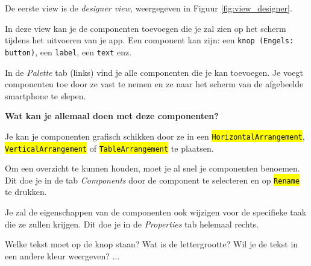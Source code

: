 De eerste view is de \emph{designer view}, weergegeven in Figuur \ref{fig:view_designer}.


In deze view kan je de componenten toevoegen die je zal zien op het scherm tijdens het uitvoeren van je app.
Een component kan zijn: een \texttt{knop (Engels: button)}, een \texttt{label}, een \texttt{text} enz.

\begin{minipage}{.3\linewidth}
\end{minipage}
\hspace{2cm}
\begin{minipage}{.5\linewidth}
	In de \emph{Palette} tab (links) vind je alle componenten die je kan toevoegen. Je voegt componenten toe door ze vast te nemen en ze naar het scherm van de afgebeelde smartphone te slepen. 
\end{minipage}


\textbf{Wat kan je allemaal doen met deze componenten? }

\begin{minipage}{.3\linewidth}
\end{minipage}
\hspace{2cm}
\begin{minipage}{.5\linewidth}
	Je kan je componenten grafisch schikken door ze in een \hl{\texttt{HorizontalArrangement}}, \hl{\texttt{VerticalArrangement}} of \hl{\texttt{TableArrangement}} te plaatsen.
\end{minipage}

\begin{minipage}{.5\linewidth}
	Om een overzicht te kunnen houden, moet je al snel je componenten benoemen. Dit doe je in de tab \emph{Components}
	door de component te selecteren en op \hl{\texttt{Rename}} te drukken.
\end{minipage}
\hspace{2cm}
\begin{minipage}{.3\linewidth}
\end{minipage}

\begin{minipage}{.5\linewidth}
	Je zal de eigenschappen van de componenten ook wijzigen voor de specifieke taak die ze zullen krijgen. Dit doe je in de \emph{Properties} tab helemaal rechts.
	
	Welke tekst moet op de knop staan? Wat is de lettergrootte? Wil je de tekst in een andere kleur weergeven? ... 
\end{minipage}
\hspace{2cm}
\begin{minipage}{.3\linewidth}
\end{minipage}

